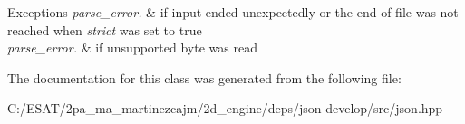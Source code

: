 \begin{DoxyExceptions}{Exceptions}
{\em parse\+\_\+error.} & if input ended unexpectedly or the end of file was not reached when {\itshape strict} was set to true \\
\hline
{\em parse\+\_\+error.} & if unsupported byte was read \\
\hline
\end{DoxyExceptions}


The documentation for this class was generated from the following file\+:\begin{DoxyCompactItemize}
\item 
C\+:/\+E\+S\+A\+T/2pa\+\_\+ma\+\_\+martinezcajm/2d\+\_\+engine/deps/json-\/develop/src/json.\+hpp\end{DoxyCompactItemize}
